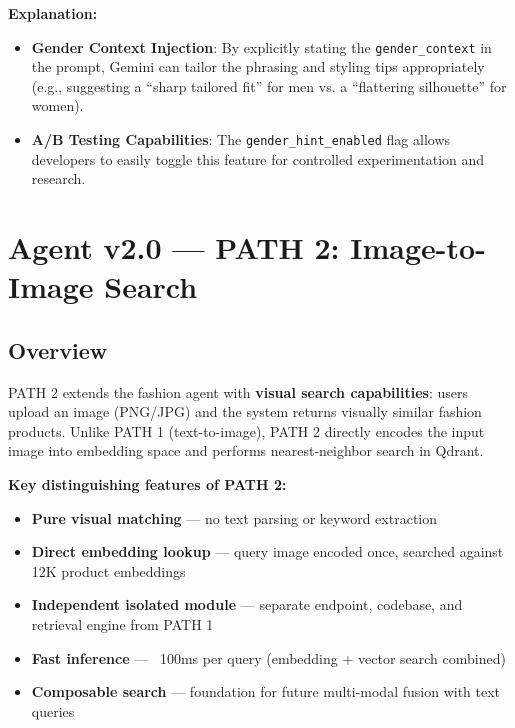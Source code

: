 \documentclass[12pt, twoside]{report}
\begin{document}
\textbf{Explanation:}
\begin{itemize}
    \item \textbf{Gender Context Injection}: By explicitly stating the \texttt{gender\_context} in the prompt, Gemini can tailor the phrasing and styling tips appropriately (e.g., suggesting a ``sharp tailored fit'' for men vs. a ``flattering silhouette'' for women).
    \item \textbf{A/B Testing Capabilities}: The \texttt{gender\_hint\_enabled} flag allows developers to easily toggle this feature for controlled experimentation and research.
\end{itemize}

\chapter{Agent v2.0 --- PATH 2: Image-to-Image Search}

\section{Overview}

PATH 2 extends the fashion agent with \textbf{visual search capabilities}: users upload an image (PNG/JPG) and the system returns visually similar fashion products. Unlike PATH 1 (text-to-image), PATH 2 directly encodes the input image into embedding space and performs nearest-neighbor search in Qdrant.

\textbf{Key distinguishing features of PATH 2:}
\begin{itemize}
    \item \textbf{Pure visual matching} --- no text parsing or keyword extraction
    \item \textbf{Direct embedding lookup} --- query image encoded once, searched against 12K product embeddings
    \item \textbf{Independent isolated module} --- separate endpoint, codebase, and retrieval engine from PATH 1
    \item \textbf{Fast inference} --- ~100ms per query (embedding + vector search combined)
    \item \textbf{Composable search} --- foundation for future multi-modal fusion with text queries
\end{itemize}
\end{document}
